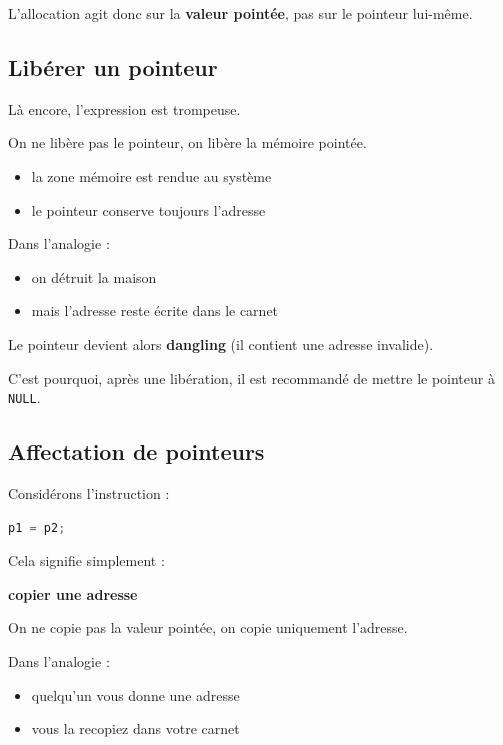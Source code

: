 L’allocation agit donc sur la \textbf{valeur pointée},
pas sur le pointeur lui-même.

\subsection{Libérer un pointeur}

Là encore, l’expression est trompeuse.

On ne libère pas le pointeur,
on libère la mémoire pointée.

\begin{itemize}
    \item la zone mémoire est rendue au système
    \item le pointeur conserve toujours l’adresse
\end{itemize}

Dans l’analogie :

\begin{itemize}
    \item on détruit la maison
    \item mais l’adresse reste écrite dans le carnet
\end{itemize}

Le pointeur devient alors \textbf{dangling}
(il contient une adresse invalide).

C’est pourquoi, après une libération,
il est recommandé de mettre le pointeur à \texttt{NULL}.

\subsection{Affectation de pointeurs}

Considérons l’instruction :

\begin{lstlisting}[language=C]
p1 = p2;
\end{lstlisting}

Cela signifie simplement :

\begin{center}
\textbf{copier une adresse}
\end{center}

On ne copie pas la valeur pointée,
on copie uniquement l’adresse.

Dans l’analogie :

\begin{itemize}
    \item quelqu’un vous donne une adresse
    \item vous la recopiez dans votre carnet
\end{itemize}


